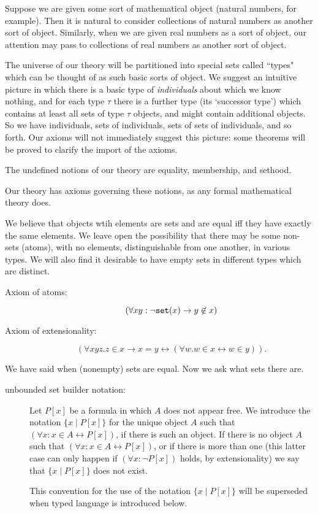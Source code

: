 \documentclass[12pt]{book}
\begin{document}
Suppose we are given some sort of mathematical object (natural
numbers, for example).  Then it is natural to consider collections of
natural numbers as another sort of object.  Similarly, when we are
given real numbers as a sort of object, our attention may pass to
collections of real numbers as another sort of object.

The universe of our theory will be partitioned into special sets called ``types" which can be thought
of as such basic sorts of object.   We suggest an intuitive picture in which there is a basic type
of {\em individuals\/} about which we know nothing, and for each type $\tau$ there is a further type (its `successor type') which contains
at least all sets of type $\tau$ objects, and might contain additional objects.  So we have individuals, sets of individuals, sets of sets of individuals, and so forth.  Our axioms will not immediately suggest this picture:  some theorems will be proved to clarify the import of the axioms.

The undefined notions of our theory are equality, membership, and sethood.

Our theory has axioms governing these notions, as any formal mathematical theory does.

We believe that objects wtih elements are  sets and are equal iff they have exactly the same elements.  We leave open the possibility that there may be some non-sets (atoms), with no elements,  distinguishable from one another,  in various types.
We will also find it desirable to have empty sets in different types which are distinct. 

\begin{description}

\item[Axiom of atoms:]  $$(\forall xy: \neg{\tt set}(x) \rightarrow y \not\in x)$$

\item[Axiom of extensionality:] $$(\forall xyz.z \in x  \rightarrow x=y\leftrightarrow (\forall w.w\in x
\leftrightarrow w\in y)).$$

\end{description}

We have said when (nonempty) sets are equal.  Now we ask what sets there are.

\begin{description}

\item[unbounded set builder notation:]  Let $P[x]$ be a formula in which $A$ does not appear free.  We introduce the notation $\{x \mid P[x]\}$ for the unique object $A$ such that
$(\forall x:x \in A \leftrightarrow P[x])$, if there is such an object.  If there is no object $A$ such that $(\forall x:x \in A \leftrightarrow P[x])$,
or if there is more than one (this latter case can only happen if $(\forall x: \neg P[x])$ holds, by extensionality) we say that $\{x \mid P[x]\}$ does not exist.

This convention for the use of the notation $\{x \mid P[x]\}$  will be superseded when typed language is introduced below.

\end{description}
\end{document}
